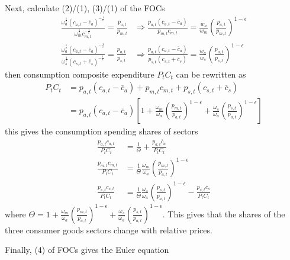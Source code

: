 \documentclass[10pt,landscape,a4paper]{article}
\let\bar\overline
\begin{document}
\begin{multicols*}{3}
Next, calculate (2)/(1), (3)/(1) of the FOCs
\begin{align*}
    \frac{\omega_a^{\frac{1}{\epsilon}}(c_{a,t}-\bar{c}_a)^{-\frac{1}{\epsilon}}}{\omega_m^{\frac{1}{\epsilon}}c_{m,t}^{-\frac{1}{\epsilon}}}=\frac{p_{a,t}}{p_{m,t}} & \Rightarrow \frac{p_{a,t}(c_{a,t}-\bar{c}_a)}{p_{m,t}c_{m,t}} = \frac{w_a}{w_m}\left(\frac{p_{a,t}}{p_{m,t}}\right)^{1-\epsilon}\\
    \frac{\omega_a^{\frac{1}{\epsilon}}(c_{a,t}-\bar{c}_a)^{-\frac{1}{\epsilon}}}{\omega_s^{\frac{1}{\epsilon}}(c_{s,t}+\bar{c}_s)^{-\frac{1}{\epsilon}}}=\frac{p_{a,t}}{p_{s,t}} & \Rightarrow \frac{p_{a,t}(c_{a,t}-\bar{c}_a)}{p_{s,t}(c_{s,t}+\bar{c}_s)} = \frac{w_a}{w_s}\left(\frac{p_{a,t}}{p_{s,t}}\right)^{1-\epsilon}
\end{align*}
then consumption composite expenditure $P_tC_t$ can be rewritten as
\begin{align*}
    P_tC_t & = p_{a,t}(c_{a,t}-\bar{c}_a)+p_{m,t}c_{m,t}+p_{s,t}(c_{s,t}+\bar{c}_s)\\
    & = p_{a,t}(c_{a,t}-\bar{c}_a)\left[ 1+\frac{\omega_m}{\omega_a}\left(\frac{p_{m,t}}{p_{a,t}}\right)^{1-\epsilon} + \frac{\omega_s}{\omega_a}\left(\frac{p_{s,t}}{p_{a,t}}\right)^{1-\epsilon}\right]
\end{align*}
this gives the consumption spending shares of sectors
\begin{align*}
    \frac{p_{a,t}c_{a,t}}{P_tC_t}&=\frac{1}{\Theta}+\frac{p_{a,t}\bar{c}_a}{P_tC_t}\\
    \frac{p_{m,t}c_{m,t}}{P_tC_t}&=\frac{1}{\Theta}\frac{\omega_m}{\omega_a} \left(\frac{p_{m,t}}{p_{a,t}}\right)^{1-\epsilon}\\
    \frac{p_{s,t}c_{s,t}}{P_tC_t}&=\frac{1}{\Theta}\frac{\omega_s}{\omega_a} \left(\frac{p_{s,t}}{p_{a,t}}\right)^{1-\epsilon}-\frac{p_{s,t}\bar{c}_s}{P_tC_t}
\end{align*}
where $\Theta = 1+\frac{\omega_m}{\omega_a}\left(\frac{p_{m,t}}{p_{a,t}}\right)^{1-\epsilon} + \frac{\omega_s}{\omega_a}\left(\frac{p_{s,t}}{p_{a,t}}\right)^{1-\epsilon}$. This gives that the shares of the three consumer goods sectors change with relative prices.

Finally, (4) of FOCs gives the Euler equation

\vspace{2pt}


\end{multicols*}
\end{document}
